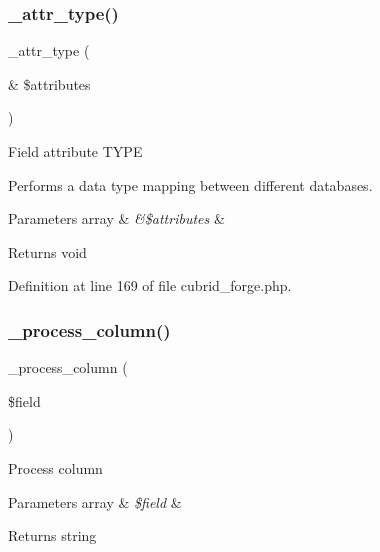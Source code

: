 \mbox{\label{class_c_i___d_b__cubrid__forge_a8553be952084c6f7cdfff370a1d14f6b}} 
\subsubsection{\texorpdfstring{\_attr\_type()}{\_attr\_type()}}
{\footnotesize\ttfamily \+\_\+attr\+\_\+type (\begin{DoxyParamCaption}\item[{\&}]{\$attributes }\end{DoxyParamCaption})\hspace{0.3cm}{\ttfamily [protected]}}

Field attribute T\+Y\+PE

Performs a data type mapping between different databases.


\begin{DoxyParams}[1]{Parameters}
array & {\em \&\$attributes} & \\
\hline
\end{DoxyParams}
\begin{DoxyReturn}{Returns}
void 
\end{DoxyReturn}


Definition at line 169 of file cubrid\+\_\+forge.\+php.

\mbox{\label{class_c_i___d_b__cubrid__forge_a8f38f1c5b5dddecca4befbe393f3f299}} 
\subsubsection{\texorpdfstring{\_process\_column()}{\_process\_column()}}
{\footnotesize\ttfamily \+\_\+process\+\_\+column (\begin{DoxyParamCaption}\item[{}]{\$field }\end{DoxyParamCaption})\hspace{0.3cm}{\ttfamily [protected]}}

Process column


\begin{DoxyParams}[1]{Parameters}
array & {\em \$field} & \\
\hline
\end{DoxyParams}
\begin{DoxyReturn}{Returns}
string 
\end{DoxyReturn}


